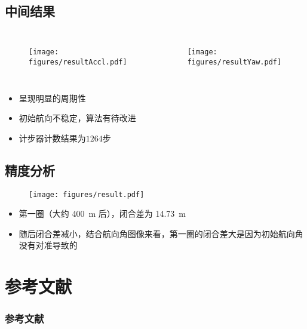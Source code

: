 \documentclass[10pt,xcolor=dvipsnames,fontset=none,punct=CCT]{ctexbeamer}
\begin{document}
\subsection{中间结果}
\begin{frame}
  \begin{columns}
    \begin{figure}
      \centering
      \texttt{[image: figures/resultAccl.pdf]}
    \end{figure}
    \begin{figure}
      \centering
      \texttt{[image: figures/resultYaw.pdf]}
    \end{figure}
  \end{columns}
  \begin{itemize}
    \item 呈现明显的周期性
    \item 初始航向不稳定，算法有待改进
    \item 计步器计数结果为$1264$步
  \end{itemize}
\end{frame}

\subsection{精度分析}
\begin{frame}
  \begin{figure}
    \centering
    \texttt{[image: figures/result.pdf]}
  \end{figure}
  \begin{itemize}
    \item 第一圈（大约 \qty{400}{m} 后），闭合差为 \qty{14.73}{m}
    \item 随后闭合差减小，结合航向角图像来看，第一圈的闭合差大是因为初始航向角没有对准导致的
  \end{itemize}
\end{frame}

\section*{参考文献}
\begin{frame}
  \frametitle{参考文献}
  \printbibliography
\end{frame}
\end{document}
